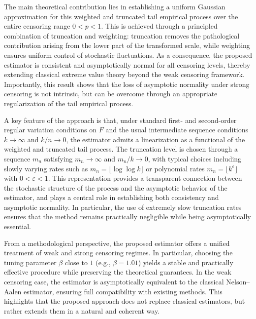 \documentclass[reqno,openbib,runningheads,a4paper,12pt]{amsart}%
\begin{document}
\noindent The main theoretical contribution lies in establishing a uniform
Gaussian approximation for this weighted and truncated tail empirical process
over the entire censoring range $0<p<1$. This is achieved through a principled
combination of truncation and weighting: truncation removes the pathological
contribution arising from the lower part of the transformed scale, while
weighting ensures uniform control of stochastic fluctuations. As a
consequence, the proposed estimator is consistent and asymptotically normal
for all censoring levels, thereby extending classical extreme value theory
beyond the weak censoring framework. Importantly, this result shows that the
loss of asymptotic normality under strong censoring is not intrinsic, but can
be overcome through an appropriate regularization of the tail empirical
process. \smallskip

\noindent A key feature of the approach is that, under standard first- and
second-order regular variation conditions on $F$ and the usual intermediate
sequence conditions $k\rightarrow\infty$ and $k/n\rightarrow0$, the estimator
admits a linearization as a functional of the weighted and truncated tail
process. The truncation level is chosen through a sequence $m_{n}$ satisfying
$m_{n}\rightarrow\infty$ and $m_{n}/k\rightarrow0$, with typical choices
including slowly varying rates such as $m_{n}=\lfloor\log\log k\rfloor$ or
polynomial rates $m_{n}=\lfloor k^{\varepsilon}\rfloor$ with $0<\varepsilon
<1$. This representation provides a transparent connection between the
stochastic structure of the process and the asymptotic behavior of the
estimator, and plays a central role in establishing both consistency and
asymptotic normality. In particular, the use of extremely slow truncation
rates ensures that the method remains practically negligible while being
asymptotically essential. \smallskip

\noindent From a methodological perspective, the proposed estimator offers a
unified treatment of weak and strong censoring regimes. In particular,
choosing the tuning parameter $\beta$ close to $1$ (e.g., $\beta=1.01$) yields
a stable and practically effective procedure while preserving the theoretical
guarantees. In the weak censoring case, the estimator is asymptotically
equivalent to the classical Nelson--Aalen estimator, ensuring full
compatibility with existing methods. This highlights that the proposed
approach does not replace classical estimators, but rather extends them in a
natural and coherent way. \smallskip
\end{document}
